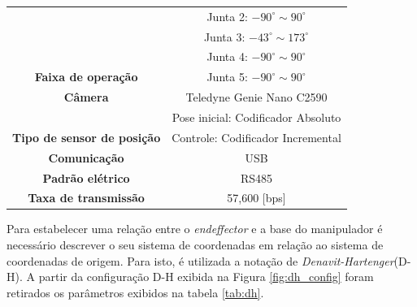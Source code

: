 \begin{table}[H]
\begin{tabular}{|c|c|}
                                                               & Junta 2: $ -90^\circ \sim 90^\circ$                            \\ \cline{2-2} 
                                                               & Junta 3: $ -43^\circ \sim 173^\circ $                          \\ \cline{2-2} 
                                                               & Junta 4: $ -90^\circ \sim 90^\circ $                           \\ \cline{2-2} 
    \multirow{-5}{*}{\textbf{Faixa de operação}}               & Junta 5: $ -90^\circ \sim 90^\circ $                           \\ \hline
    \rowcolor[HTML]{EFEFEF} 
    \textbf{Câmera}                                            & Teledyne Genie Nano C2590                                      \\ \hline
                                                               & Pose inicial: Codificador Absoluto                             \\ \cline{2-2} 
    \multirow{-2}{*}{\textbf{Tipo de sensor de posição}}       & Controle: Codificador Incremental                              \\ \hline
    \rowcolor[HTML]{EFEFEF} 
    \textbf{Comunicação}                                       & USB                                                            \\ \hline
    \textbf{Padrão elétrico}                                   & \cellcolor[HTML]{FFFFFF}RS485                                  \\ \hline
    \rowcolor[HTML]{EFEFEF} 
    \textbf{Taxa de transmissão}                               & 57,600 {[}bps{]}                                               \\ \hline
    \end{tabular}
    \label{tab:esp_table}
    \end{table}




Para estabelecer uma relação entre o \textit{endeffector} e a base do manipulador é necessário descrever o seu sistema de coordenadas em relação ao sistema de coordenadas de origem. Para isto, é utilizada a notação de \textit{Denavit-Hartenger}(D-H). A partir da configuração D-H exibida na Figura \ref{fig:dh_config} foram retirados os parâmetros exibidos na tabela \ref{tab:dh}.


